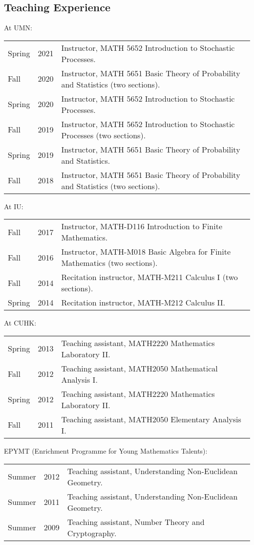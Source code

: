 \documentclass[margin,line,pifont,palatino,courier]{res}
\begin{document}
\begin{resume}
\section{\sc Teaching Experience}
At UMN:\\
\begin{tabular}{@{}p{0.4in}p{0.3in}p{4in}}
	Spring & 2021 & Instructor, MATH 5652 Introduction to Stochastic Processes.\\
	Fall & 2020 & Instructor, MATH 5651 Basic Theory of Probability and Statistics (two sections).\\
	Spring & 2020 & Instructor, MATH 5652 Introduction to Stochastic Processes.\\
	Fall & 2019 & Instructor, MATH 5652 Introduction to Stochastic Processes (two sections).\\
	Spring & 2019 & Instructor, MATH 5651 Basic Theory of Probability and Statistics.\\
	Fall & 2018 & Instructor, MATH 5651 Basic Theory of Probability and Statistics (two sections).\\
\end{tabular}

At IU:\\
\begin{tabular}{@{}p{0.4in}p{0.3in}p{4in}}
Fall & 2017 & Instructor, MATH-D116 Introduction to Finite Mathematics.\\
Fall & 2016 & Instructor, MATH-M018 Basic Algebra for Finite Mathematics (two sections).\\
Fall & 2014 & Recitation instructor, MATH-M211 Calculus I (two sections).\\
Spring & 2014 & Recitation instructor, MATH-M212 Calculus II.\\
\end{tabular}

At CUHK:\\
\begin{tabular}{@{}p{0.4in}p{0.3in}p{4in}}
Spring & 2013 & Teaching assistant, MATH2220 Mathematics Laboratory II.\\
Fall & 2012 & Teaching assistant, MATH2050 Mathematical Analysis I.\\
Spring & 2012 & Teaching assistant, MATH2220 Mathematics Laboratory II.\\
Fall & 2011 & Teaching assistant, MATH2050 Elementary Analysis I.\\
\end{tabular}

EPYMT (Enrichment Programme for Young Mathematics Talents):\\
\begin{tabular}{@{}p{0.4in}p{0.3in}p{4in}}
Summer & 2012 & Teaching assistant, Understanding Non-Euclidean Geometry.\\
Summer & 2011 & Teaching assistant, Understanding Non-Euclidean Geometry.\\
Summer & 2009 & Teaching assistant, Number Theory and Cryptography.
\end{tabular}


\end{resume}
\end{document}
